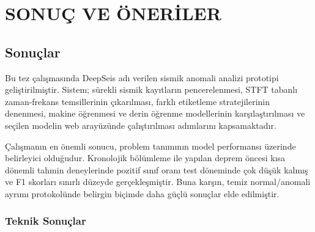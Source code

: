 \chapter{SONUÇ VE ÖNERİLER}

\section{Sonuçlar}

Bu tez çalışmasında DeepSeis adı verilen sismik anomali analizi prototipi geliştirilmiştir. Sistem; sürekli sismik kayıtların pencerelenmesi, STFT tabanlı zaman-frekans temsillerinin çıkarılması, farklı etiketleme stratejilerinin denenmesi, makine öğrenmesi ve derin öğrenme modellerinin karşılaştırılması ve seçilen modelin web arayüzünde çalıştırılması adımlarını kapsamaktadır.

Çalışmanın en önemli sonucu, problem tanımının model performansı üzerinde belirleyici olduğudur. Kronolojik bölümleme ile yapılan deprem öncesi kısa dönemli tahmin deneylerinde pozitif sınıf oranı test döneminde çok düşük kalmış ve F1 skorları sınırlı düzeyde gerçekleşmiştir. Buna karşın, temiz normal/anomali ayrımı protokolünde belirgin biçimde daha güçlü sonuçlar elde edilmiştir.

\subsection{Teknik Sonuçlar}

